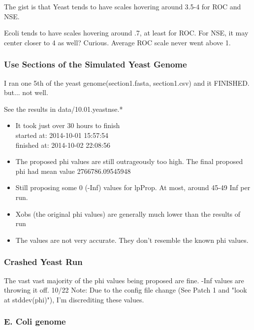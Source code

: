 The gist is that Yeast tends to have scales hovering around 3.5-4 for ROC and NSE.

Ecoli tends to have scales hovering around .7, at least for ROC. For NSE, it may center closer to 4 as well? Curious. Average ROC scale never went above 1.

\subsubsection{Use Sections of the Simulated Yeast Genome}
I ran one 5th of the yeast genome(section1.fasta, section1.csv) and it FINISHED. but... not well.

See the results in data/10.01.yeastnse.*

\begin{itemize}
\item It took just over 30 hours to finish\\
started at: 2014-10-01 15:57:54\\
finished at: 2014-10-02 22:08:56 

\item The proposed phi values are still outrageously too high. The final proposed phi had mean value 2766786.09545948

\item Still proposing some 0 (-Inf) values for lpProp. At most, around 45-49 Inf per run.

\item Xobs (the original phi values) are generally much lower than the results of run

\item The values are not very accurate. They don't resemble the known phi values.

\end{itemize}


\subsubsection{Crashed Yeast Run}

The vast vast majority of the phi values being proposed are fine. -Inf values are throwing it off. 
10/22 Note: Due to the config file change (See Patch 1 and "look at stddev(phi)"), I'm discrediting these values.


\subsubsection{E. Coli genome}

